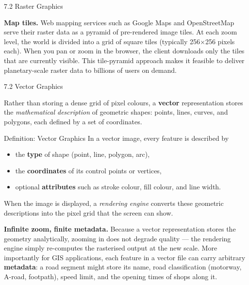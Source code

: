 \documentclass[aspectratio=169,10pt]{beamer}
\begin{document}
\begin{frame}[allowframebreaks]{7.2 Raster Graphics}
  \framebreak

  \textbf{Map tiles.}
  Web mapping services such as Google Maps and OpenStreetMap serve
  their raster data as a pyramid of pre-rendered image tiles.  At
  each zoom level, the world is divided into a grid of square tiles
  (typically 256$\times$256 pixels each).  When you pan or zoom in
  the browser, the client downloads only the tiles that are currently
  visible.  This tile-pyramid approach makes it feasible to deliver
  planetary-scale raster data to billions of users on demand.

\end{frame}

\begin{frame}[allowframebreaks]{7.2 Vector Graphics}

  Rather than storing a dense grid of pixel colours, a
  \textbf{vector} representation stores the \emph{mathematical
  description} of geometric shapes: points, lines, curves, and
  polygons, each defined by a set of coordinates.

  \begin{block}{Definition: Vector Graphics}
    In a vector image, every feature is described by
    \begin{itemize}
      \item the \textbf{type} of shape (point, line, polygon, arc),
      \item the \textbf{coordinates} of its control points or vertices,
      \item optional \textbf{attributes} such as stroke colour, fill
            colour, and line width.
    \end{itemize}
    When the image is displayed, a \emph{rendering engine} converts
    these geometric descriptions into the pixel grid that the screen
    can show.
  \end{block}

  \textbf{Infinite zoom, finite metadata.}
  Because a vector representation stores the geometry analytically,
  zooming in does not degrade quality --- the rendering engine
  simply re-computes the rasterised output at the new scale.
  More importantly for GIS applications, each feature in a vector
  file can carry arbitrary \textbf{metadata}: a road segment might
  store its name, road classification (motorway, A-road, footpath),
  speed limit, and the opening times of shops along it.


\end{frame}
\end{document}
